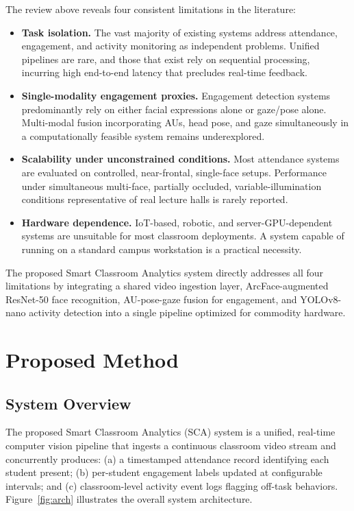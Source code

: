 \documentclass[preprint,12pt]{elsarticle}
\begin{document}
The review above reveals four consistent limitations in the literature:
\begin{itemize}
    \item \textbf{Task isolation.} The vast majority of existing systems address attendance, engagement, and activity monitoring as independent problems. Unified pipelines are rare, and those that exist rely on sequential processing, incurring high end-to-end latency that precludes real-time feedback.
    \item \textbf{Single-modality engagement proxies.} Engagement detection systems predominantly rely on either facial expressions alone or gaze/pose alone. Multi-modal fusion incorporating AUs, head pose, and gaze simultaneously in a computationally feasible system remains underexplored.
    \item \textbf{Scalability under unconstrained conditions.} Most attendance systems are evaluated on controlled, near-frontal, single-face setups. Performance under simultaneous multi-face, partially occluded, variable-illumination conditions representative of real lecture halls is rarely reported.
    \item \textbf{Hardware dependence.} IoT-based, robotic, and server-GPU-dependent systems are unsuitable for most classroom deployments. A system capable of running on a standard campus workstation is a practical necessity.
\end{itemize}

The proposed Smart Classroom Analytics system directly addresses all four limitations by integrating a shared video ingestion layer, ArcFace-augmented ResNet-50 face recognition, AU-pose-gaze fusion for engagement, and YOLOv8-nano activity detection into a single pipeline optimized for commodity hardware.

\section{Proposed Method} \label{section3}

\subsection{System Overview}

The proposed Smart Classroom Analytics (SCA) system is a unified, real-time computer vision pipeline that ingests a continuous classroom video stream and concurrently produces: (a) a timestamped attendance record identifying each student present; (b) per-student engagement labels updated at configurable intervals; and (c) classroom-level activity event logs flagging off-task behaviors. Figure~\ref{fig:arch} illustrates the overall system architecture.
\end{document}
